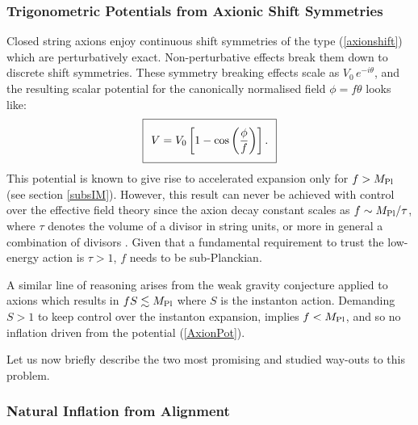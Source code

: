 \subsubsection{Trigonometric Potentials from Axionic Shift Symmetries}

Closed string axions enjoy continuous shift symmetries of the type (\ref{axionshift}) which are perturbatively exact. Non-perturbative effects break them down to discrete shift symmetries. These symmetry breaking effects scale as $V_0\,e^{- i \theta}$, and the resulting scalar potential for the canonically normalised field $\phi = f \theta$ looks like:
\begin{equation}
\setlength\fboxsep{0.25cm}
\setlength\fboxrule{0.4pt}
\boxed{
V = V_0 \left[1-\cos\left(\frac{\phi}{f}\right)\right].
}
\label{AxionPot}
\end{equation}
This potential is known to give rise to accelerated expansion only for $f>M_{\rm Pl}$ (see section \ref{subsIM}). However, this result can never be achieved with control over the effective field theory since the axion decay constant scales as $f\sim M_{\rm Pl}/\tau$, where $\tau$ denotes the volume of a divisor in string units, or more in general a combination of divisors \cite{Svrcek:2006yi,Cicoli:2012sz}. Given that a fundamental requirement to trust the low-energy action is $\tau> 1$, $f$ needs to be sub-Planckian. 

A similar line of reasoning arises from the weak gravity conjecture \cite{Arkani-Hamed:2006emk} applied to axions which results in $f S \lesssim M_{\rm Pl}$ where $S$ is the instanton action. Demanding $S>1$ to keep control over the instanton expansion, implies $f<M_{\rm Pl}$, and so no inflation driven from the potential (\ref{AxionPot}). 

Let us now briefly describe the two most promising and studied way-outs to this problem.

\subsubsection*{Natural Inflation from Alignment}

